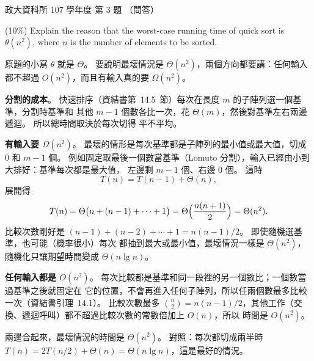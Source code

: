 \begin{pastexam}[label={px:nccu-107-dsa-03}]{政大資科所 107 學年度 第 3 題}
（問答）

(10\%) Explain the reason that the worst-case running time of quick sort is $\theta(n^2)$, where $n$
is the number of elements to be sorted.
\end{pastexam}

\begin{pastsoln}
原題的小寫 $\theta$ 就是 $\Theta$。 要說明最壞情況是 $\Theta(n^2)$，兩個方向都要講：任何輸入都不超過
$O(n^2)$，而且有輸入真的要 $\Omega(n^2)$。

\textbf{分割的成本}。 快速排序（資結書第~14.5~節）每次在長度 $m$ 的子陣列選一個基準，分割時基準和
其他 $m - 1$ 個數各比一次，花 $\Theta(m)$，然後對基準左右兩邊遞迴。 所以總時間取決於每次切得
平不平均。

\textbf{有輸入要 $\Omega(n^2)$}。 最壞的情形是每次基準都是子陣列的最小值或最大值，切成 $0$ 和
$m - 1$ 個。 例如固定取最後一個數當基準（Lomuto 分割），輸入已經由小到大排好：基準每次都是最大值，
左邊剩 $m - 1$ 個、右邊 $0$ 個。 這時
\[
T(n) = T(n - 1) + \Theta(n),
\]
展開得
\[
T(n) = \Theta\bigl(n + (n - 1) + \cdots + 1\bigr) = \Theta\Bigl(\frac{n(n+1)}{2}\Bigr) = \Theta(n^2).
\]
比較次數剛好是 $(n - 1) + (n - 2) + \cdots + 1 = n(n-1)/2$。 即使隨機選基準，也可能（機率很小）每次
都抽到最大或最小值，最壞情況一樣是 $\Theta(n^2)$，隨機化只讓期望時間變成 $\Theta(n \lg n)$。

\textbf{任何輸入都是 $O(n^2)$}。 每次比較都是基準和同一段裡的另一個數比；一個數當過基準之後就固定在
它的位置，不會再進入任何子陣列，所以任兩個數最多比較一次（資結書引理~14.1）。 比較次數最多
$\binom{n}{2} = n(n-1)/2$，其他工作（交換、遞迴呼叫）都不超過比較次數的常數倍加上 $O(n)$，所以
時間是 $O(n^2)$。

兩邊合起來，最壞情況的時間是 $\Theta(n^2)$。 對照：每次都切成兩半時 $T(n) = 2T(n/2) + \Theta(n) =
\Theta(n \lg n)$，這是最好的情況。
\end{pastsoln}
